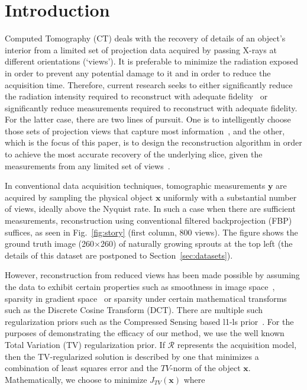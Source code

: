 \documentclass[journal]{IEEEtran}
\begin{document}
\section{Introduction}
\label{sec:intro}
Computed Tomography (CT) deals with the recovery of details of an
object's interior from a limited set of projection data acquired by
passing X-rays at different orientations (`views'). It is preferable
to minimize the radiation exposed in order to prevent any potential
damage to it and in order to reduce the acquisition time. Therefore,
current research seeks to either significantly reduce the radiation
intensity required to reconstruct with adequate
fidelity~\cite{yang2018,Lin2016,Xie2017,gopal2019low} or significantly
reduce measurements required to reconstruct with
adequate fidelity. For the latter case, there are two lines of
pursuit. One is to intelligently choose those sets of projection views
that capture most
information~\cite{King2018,Anthony2018,barkan17,fischer16,andrei14},
and the other, which is the focus of this paper, is to design the
reconstruction algorithm in order to achieve the most accurate
recovery of the underlying slice, given the measurements from any
limited set of views~\cite{yang2018,geyer2015,kilic2011}.

In conventional data acquisition techniques, tomographic measurements
$\boldsymbol{y}$ are acquired by sampling the physical object
$\boldsymbol{x}$ uniformly with a substantial number of views, ideally
above the Nyquist rate. In such a case when there are sufficient
measurements, reconstruction using conventional filtered
backprojection (FBP) suffices, as seen in Fig.~\ref{fig:story} (first
column, 800 views). The figure shows the ground truth image
(260$\times$260) of naturally growing sprouts at the top left (the
details of this dataset are postponed to Section~\ref{sec:datasets}).

However, reconstruction from reduced views has been made possible by
assuming the data to exhibit certain properties such as smoothness in
image space~\cite{Essam2015}, sparsity in gradient space~\cite{TV} or sparsity under
certain mathematical transforms~\cite{Donoho,introCS} such as the
Discrete Cosine Transform (DCT).  There are multiple such
regularization priors such as the Compressed
Sensing based l1-ls prior~\cite{my_dicta_paper}. For the purposes of
demonstrating the efficacy of our method, we use the well known Total Variation (TV)
regularization prior.
If $\boldsymbol{\mathcal{R}}$ represents the acquisition
model, then the TV-regularized solution is described by one that
minimizes a combination of least squares error and the $TV$-norm of
the object $\boldsymbol{x}$. Mathematically, we choose to minimize
$J_{TV}(\boldsymbol{x})$ where
\end{document}
